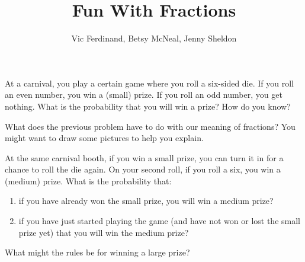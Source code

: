 \documentclass[nooutcomes]{ximera}
\title{Fun With Fractions}
\author{Vic Ferdinand, Betsy McNeal, Jenny Sheldon}
\begin{document}
\begin{abstract}
\end{abstract}
\maketitle



\begin{problem}
At a carnival, you play a certain game where you roll a six-sided die.  If you roll an even number, you win a (small) prize.  If you roll an odd number, you get nothing.  What is the probability that you will win a prize?  How do you know?
\end{problem}

\begin{problem}
What does the previous problem have to do with our meaning of fractions?  You might want to draw some pictures to help you explain.
\end{problem}

\begin{problem}
At the same carnival booth, if you win a small prize, you can turn it in for a chance to roll the die again.  On your second roll, if you roll a six, you win a (medium) prize.  What is the probability that:
\begin{enumerate}
\item if you have already won the small prize, you will win a medium prize?
\item if you have just started playing the game (and have not won or lost the small prize yet) that you will win the medium prize?
\end{enumerate}

\end{problem}

\begin{problem}
What might the rules be for winning a large prize?
\end{problem}
\end{document}

